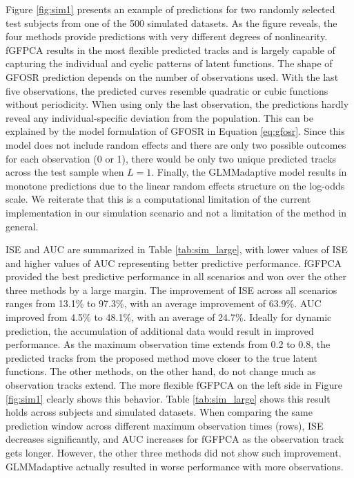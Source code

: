 \documentclass[12pt]{article}
\begin{document}
Figure \ref{fig:sim1} presents an example of predictions for two randomly selected test subjects from one of the 500 simulated datasets. As the figure reveals, the four methods provide predictions with very different degrees of nonlinearity. fGFPCA results in the most flexible predicted tracks and is largely capable of capturing the individual and cyclic patterns of latent functions. The shape of GFOSR prediction depends on the number of observations used. With the last five observations, the predicted curves resemble quadratic or cubic functions without periodicity. When using only the last observation, the predictions hardly reveal any individual-specific deviation from the population. This can be explained by the model formulation of GFOSR in Equation \ref{eq:gfosr}. Since this model does not include random effects and there are only two possible outcomes for each observation (0 or 1), there would be only two unique predicted tracks across the test sample when $L=1$. Finally, the GLMMadaptive model results in monotone predictions due to the linear random effects structure on the log-odds scale. We reiterate that this is a computational limitation of the current implementation in our simulation scenario and not a limitation of the method in general. 

ISE and AUC are summarized in Table \ref{tab:sim_large}, with lower values of ISE and higher values of AUC representing better predictive performance. fGFPCA provided the best predictive performance in all scenarios and won over the other three methods by a large margin. The improvement of ISE across all scenarios ranges from 13.1\% to 97.3\%, with an average improvement of 63.9\%. AUC improved from 4.5\% to 48.1\%, with an average of 24.7\%. Ideally for dynamic prediction, the accumulation of additional data would result in improved performance. As the maximum observation time extends from 0.2 to 0.8, the predicted tracks from the proposed method move closer to the true latent functions. The other methods, on the other hand, do not change much as observation tracks extend. The more flexible fGFPCA on the left side in Figure \ref{fig:sim1} clearly shows this behavior. Table \ref{tab:sim_large} shows this result holds across subjects and simulated datasets. When comparing the same prediction window across different maximum observation times (rows), ISE decreases significantly, and AUC increases for fGFPCA as the observation track gets longer. However, the other three methods did not show such improvement. GLMMadaptive actually resulted in worse performance with more observations.
\end{document}
